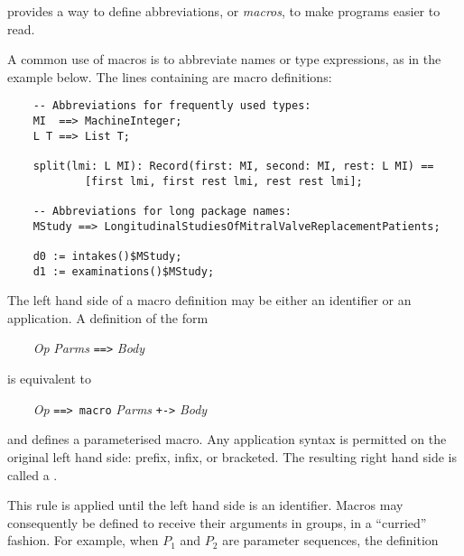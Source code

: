 \newcommand{\stdindent}{{\normalsize {\tt \ \ \ \ }}}


\asharp{} provides a way to define abbreviations, or {\em macros},
to make programs easier to read.

A common use of macros is to abbreviate names or type expressions,
as in the example below.
The lines containing \ttin{==>} are macro definitions:
\keywordIndex{==>}

\begin{small}
\begin{verbatim}
    -- Abbreviations for frequently used types:
    MI  ==> MachineInteger;
    L T ==> List T;

    split(lmi: L MI): Record(first: MI, second: MI, rest: L MI) ==
            [first lmi, first rest lmi, rest rest lmi];

    -- Abbreviations for long package names:
    MStudy ==> LongitudinalStudiesOfMitralValveReplacementPatients;

    d0 := intakes()$MStudy;
    d1 := examinations()$MStudy;
\end{verbatim}
\end{small}

The left hand side of a macro definition may be either an
identifier or an application.
A definition of the form

\stdindent {\it Op} {\it Parms} {\tt ==>} {\it Body}

is equivalent to

\stdindent {\it Op} {\tt ==> macro} {\it Parms} {\tt +->} {\it Body}

and defines a parameterised macro.
Any application syntax is permitted on the original left hand side:
prefix, infix, or bracketed.
The resulting right hand side is called a .

This rule is applied until the left hand side is an identifier.
Macros \linebreak may consequently be defined to receive their arguments
in groups, in a ``curried'' fashion.
For example, when $P_1$ and $P_2$ are parameter sequences, the definition


